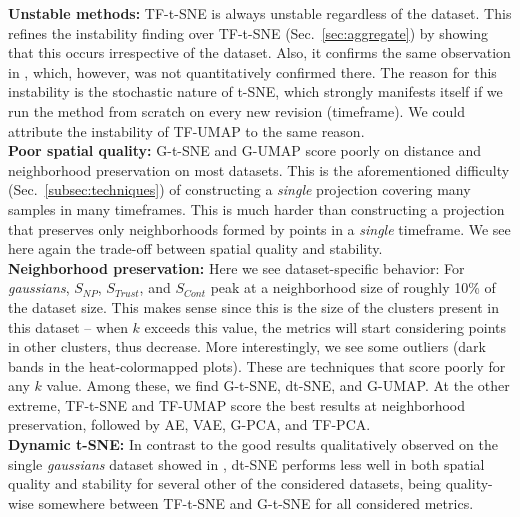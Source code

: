 \noindent\textbf{Unstable methods:}  TF-t-SNE is always unstable regardless of the dataset. This refines the instability finding over TF-t-SNE (Sec.~\ref{sec:aggregate}) by showing that this occurs irrespective of the dataset. Also, it confirms the same observation in \cite{Rauber2016}, which, however, was not quantitatively confirmed there. The reason for this instability is the stochastic nature of t-SNE, which strongly manifests itself if we run the method from scratch on every new revision (timeframe). We could attribute the instability of TF-UMAP to the same reason.\\

\noindent\textbf{Poor spatial quality:} G-t-SNE and G-UMAP score poorly on distance and neighborhood preservation on most datasets. This is the aforementioned difficulty (Sec.~\ref{subsec:techniques}) of constructing a \emph{single} projection covering many samples in many timeframes. This is much harder than constructing a projection that preserves only neighborhoods formed by points in a \emph{single} timeframe. We see here again the trade-off between spatial quality and stability.\\

\noindent\textbf{Neighborhood preservation:}
Here we see dataset-specific behavior: For \emph{gaussians}, $S_{NP}$, $S_{Trust}$, and $S_{Cont}$ peak at a neighborhood size of roughly 10\% of the dataset size. This makes sense since this is the size of the clusters present in this dataset -- when $k$ exceeds this value, the metrics will start considering points in other clusters, thus decrease. More interestingly, we see some outliers (dark bands in the heat-colormapped plots). These are techniques that score poorly for any $k$ value. Among these, we find G-t-SNE, dt-SNE, and G-UMAP. At the other extreme, TF-t-SNE and TF-UMAP score the best results at neighborhood preservation, followed by AE, VAE, G-PCA, and TF-PCA.\\


\noindent\textbf{Dynamic t-SNE:} In contrast to the good results qualitatively observed on the single \emph{gaussians} dataset showed in \cite{Rauber2016}, dt-SNE performs less well in both spatial quality and stability for several other of the considered datasets, being quality-wise somewhere between TF-t-SNE and G-t-SNE for all considered metrics.\\

